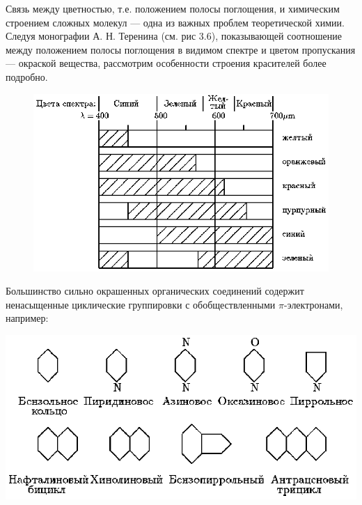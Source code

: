 Связь между цветностью, т.е. положением полосы
поглощения, и химическим строением сложных молекул --- одна из
важных проблем теоретической химии. Следуя монографии А. Н.
Теренина (см. рис 3.6), показывающей соотношение между положением
полосы поглощения в видимом спектре и цветом пропускания ---
окраской вещества, рассмотрим особенности строения красителей
более подробно.

\begin{figure}[tbp]
\centerline{\hbox{\includegraphics[scale=1.0]{Ris/ris_eps/ris3_06.eps}}}

\end{figure}

Большинство сильно окрашенных органических соединений содержит
ненасыщенные циклические группировки с обобществленными
$\pi$-электронами, например:

\vskip 3mm
\centerline{\hbox{\includegraphics[scale=1.0]{Ris/ris_eps/ris3_06a.eps}}}

